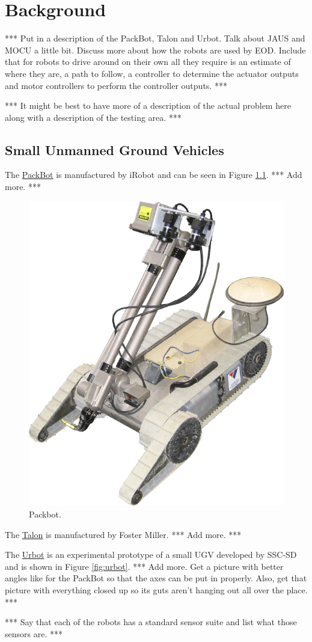 \chapter{Background}
\label{ch:background}
*** Put in a description of the PackBot, Talon and Urbot. Talk about JAUS and MOCU a little bit. Discuss more about how the robots are used by EOD. Include that for robots to drive around on their own all they require is an estimate of where they are, a path to follow, a controller to determine the actuator outputs and motor controllers to perform the controller outputs. ***

*** It might be best to have more of a description of the actual problem here along with a description of the testing area. ***

\section{Small Unmanned Ground Vehicles}
\label{sec:smallugvs}
The \href{http://www.irobot.com/sp.cfm?pageid=171}{PackBot} is manufactured by iRobot and can be seen in Figure \ref{fig:packbot}. *** Add more. ***

\begin{figure}[ht!]
	\centering
	\includegraphics[width=.3\textwidth]{images/packbot}
	\caption{Packbot.}
	\label{fig:packbot}
\end{figure}

The \href{http://www.foster-miller.com/lemming.htm}{Talon} is manufactured by Foster Miller. *** Add more. ***

The \href{http://www.spawar.navy.mil/robots/land/mprs/mprs.html}{Urbot} is an experimental prototype of a small UGV developed by SSC-SD and is shown in Figure \ref{fig:urbot}. *** Add more. Get a picture with better angles like for the PackBot so that the axes can be put in properly. Also, get that picture with everything closed up so its guts aren't hanging out all over the place. ***

*** Say that each of the robots has a standard sensor suite and list what those sensors are. ***

